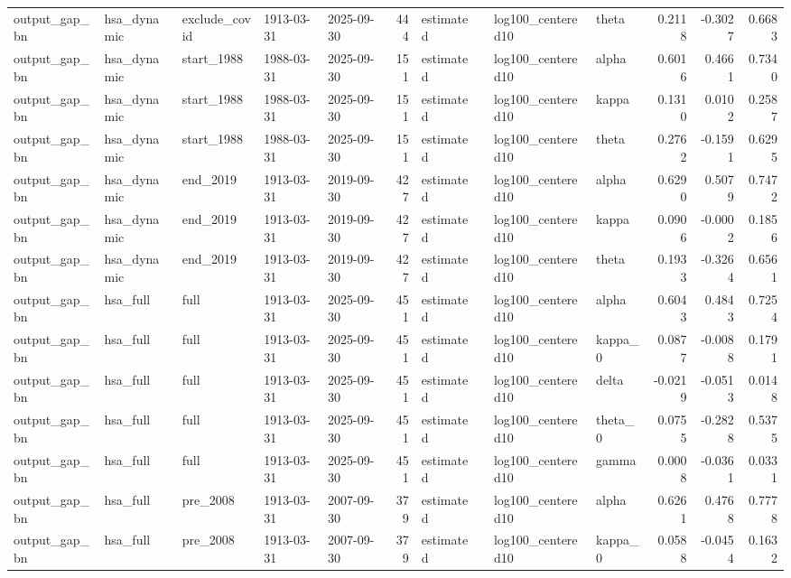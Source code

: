 \begin{tabular}{lllllrllllrrr}
output\_gap\_bn & hsa\_dynamic & exclude\_covid & 1913-03-31 & 2025-09-30 & 444 & estimated &  & log100\_centered10 & theta & 0.2118 & -0.3027 & 0.6683 \\
output\_gap\_bn & hsa\_dynamic & start\_1988 & 1988-03-31 & 2025-09-30 & 151 & estimated &  & log100\_centered10 & alpha & 0.6016 & 0.4661 & 0.7340 \\
output\_gap\_bn & hsa\_dynamic & start\_1988 & 1988-03-31 & 2025-09-30 & 151 & estimated &  & log100\_centered10 & kappa & 0.1310 & 0.0102 & 0.2587 \\
output\_gap\_bn & hsa\_dynamic & start\_1988 & 1988-03-31 & 2025-09-30 & 151 & estimated &  & log100\_centered10 & theta & 0.2762 & -0.1591 & 0.6295 \\
output\_gap\_bn & hsa\_dynamic & end\_2019 & 1913-03-31 & 2019-09-30 & 427 & estimated &  & log100\_centered10 & alpha & 0.6290 & 0.5079 & 0.7472 \\
output\_gap\_bn & hsa\_dynamic & end\_2019 & 1913-03-31 & 2019-09-30 & 427 & estimated &  & log100\_centered10 & kappa & 0.0906 & -0.0002 & 0.1856 \\
output\_gap\_bn & hsa\_dynamic & end\_2019 & 1913-03-31 & 2019-09-30 & 427 & estimated &  & log100\_centered10 & theta & 0.1933 & -0.3264 & 0.6561 \\
output\_gap\_bn & hsa\_full & full & 1913-03-31 & 2025-09-30 & 451 & estimated &  & log100\_centered10 & alpha & 0.6043 & 0.4843 & 0.7254 \\
output\_gap\_bn & hsa\_full & full & 1913-03-31 & 2025-09-30 & 451 & estimated &  & log100\_centered10 & kappa\_0 & 0.0877 & -0.0088 & 0.1791 \\
output\_gap\_bn & hsa\_full & full & 1913-03-31 & 2025-09-30 & 451 & estimated &  & log100\_centered10 & delta & -0.0219 & -0.0513 & 0.0148 \\
output\_gap\_bn & hsa\_full & full & 1913-03-31 & 2025-09-30 & 451 & estimated &  & log100\_centered10 & theta\_0 & 0.0755 & -0.2828 & 0.5375 \\
output\_gap\_bn & hsa\_full & full & 1913-03-31 & 2025-09-30 & 451 & estimated &  & log100\_centered10 & gamma & 0.0008 & -0.0361 & 0.0331 \\
output\_gap\_bn & hsa\_full & pre\_2008 & 1913-03-31 & 2007-09-30 & 379 & estimated &  & log100\_centered10 & alpha & 0.6261 & 0.4768 & 0.7778 \\
output\_gap\_bn & hsa\_full & pre\_2008 & 1913-03-31 & 2007-09-30 & 379 & estimated &  & log100\_centered10 & kappa\_0 & 0.0588 & -0.0454 & 0.1632 \\

\end{tabular}
